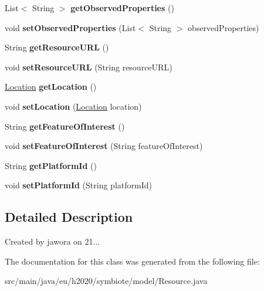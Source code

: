 \begin{DoxyCompactItemize}
List$<$ String $>$ {\bfseries get\+Observed\+Properties} ()
\item 
\mbox{\label{classeu_1_1h2020_1_1symbiote_1_1model_1_1Resource_a826dbee60cf539ffbf1a088496ac7e11}} 
void {\bfseries set\+Observed\+Properties} (List$<$ String $>$ observed\+Properties)
\item 
\mbox{\label{classeu_1_1h2020_1_1symbiote_1_1model_1_1Resource_a4a0c05d9007f2216c55ddc32a44f467b}} 
String {\bfseries get\+Resource\+U\+RL} ()
\item 
\mbox{\label{classeu_1_1h2020_1_1symbiote_1_1model_1_1Resource_a27d7401a8087bf902fd575039d574d0c}} 
void {\bfseries set\+Resource\+U\+RL} (String resource\+U\+RL)
\item 
\mbox{\label{classeu_1_1h2020_1_1symbiote_1_1model_1_1Resource_acfb7ead093f1ed692640c99daba8fc6c}} 
\hyperlink{classeu_1_1h2020_1_1symbiote_1_1model_1_1Location}{Location} {\bfseries get\+Location} ()
\item 
\mbox{\label{classeu_1_1h2020_1_1symbiote_1_1model_1_1Resource_a14eba3bd0171783f32d6d4446768905d}} 
void {\bfseries set\+Location} (\hyperlink{classeu_1_1h2020_1_1symbiote_1_1model_1_1Location}{Location} location)
\item 
\mbox{\label{classeu_1_1h2020_1_1symbiote_1_1model_1_1Resource_a1e5912a2e60f0d2dcda674f26ebe871b}} 
String {\bfseries get\+Feature\+Of\+Interest} ()
\item 
\mbox{\label{classeu_1_1h2020_1_1symbiote_1_1model_1_1Resource_abcfd5b3b2e1515ca7e9eb50eeb7ed0cf}} 
void {\bfseries set\+Feature\+Of\+Interest} (String feature\+Of\+Interest)
\item 
\mbox{\label{classeu_1_1h2020_1_1symbiote_1_1model_1_1Resource_a97e847fb787ea9fe1d16d8bd702deece}} 
String {\bfseries get\+Platform\+Id} ()
\item 
\mbox{\label{classeu_1_1h2020_1_1symbiote_1_1model_1_1Resource_a4f3c37b066d6e6587912fa1f1240048f}} 
void {\bfseries set\+Platform\+Id} (String platform\+Id)
\end{DoxyCompactItemize}


\subsection{Detailed Description}
Created by jawora on 21... 

The documentation for this class was generated from the following file\+:\begin{DoxyCompactItemize}
\item 
src/main/java/eu/h2020/symbiote/model/Resource.\+java\end{DoxyCompactItemize}
